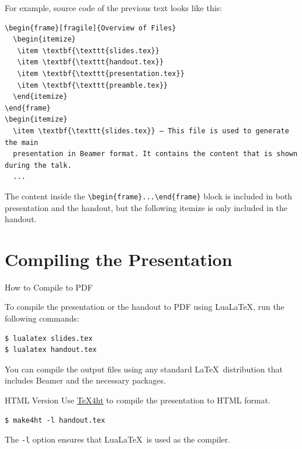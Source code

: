 For example, source code of the previous text looks like this:

\begin{verbatim}
\begin{frame}[fragile]{Overview of Files}
  \begin{itemize}
   \item \textbf{\texttt{slides.tex}} 
   \item \textbf{\texttt{handout.tex}}
   \item \textbf{\texttt{presentation.tex}}
   \item \textbf{\texttt{preamble.tex}}
  \end{itemize}
\end{frame}
\begin{itemize}
  \item \textbf{\texttt{slides.tex}} – This file is used to generate the main 
  presentation in Beamer format. It contains the content that is shown during the talk.
  ...
\end{verbatim}

The content inside the \verb|\begin{frame}...\end{frame}| block is included in both presentation
and the handout, but the following itemize is only included in the handout. 


\section{Compiling the Presentation}

\begin{frame}[fragile]{How to Compile to PDF} 

To compile the presentation or the handout to PDF using LuaLaTeX, run the following commands:

\begin{verbatim}
$ lualatex slides.tex
$ lualatex handout.tex
\end{verbatim}
\end{frame}

You can compile the output files using any standard \LaTeX\ distribution that includes Beamer and the necessary packages.

\begin{frame}[fragile]{HTML Version}
  Use \href{https://www.tug.org/tex4ht/}{\TeX4ht} to compile the presentation to HTML format. 
\begin{verbatim}
$ make4ht -l handout.tex    
\end{verbatim}

The \verb|-l| option  ensures that Lua\LaTeX\ is used as the compiler. 
\end{frame}


